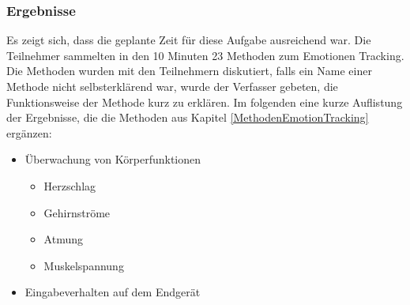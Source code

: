 \vspace{2mm}
\subsubsection*{Ergebnisse}
Es zeigt sich, dass die geplante Zeit für diese Aufgabe ausreichend war. Die Teilnehmer sammelten in den 10 Minuten 23 Methoden zum Emotionen Tracking. Die Methoden wurden mit den Teilnehmern diskutiert, falls ein Name einer Methode nicht selbsterklärend war, wurde der Verfasser gebeten, die Funktionsweise der Methode kurz zu erklären. Im folgenden eine kurze Auflistung der Ergebnisse, die die Methoden aus Kapitel \ref{MethodenEmotionTracking} ergänzen:

\begin{itemize}
	\item Überwachung von Körperfunktionen
	\begin{itemize}
		\item Herzschlag
		\item Gehirnströme
		\item Atmung
		\item Muskelspannung
	\end{itemize}
	\item Eingabeverhalten auf dem Endgerät	
\end{itemize}

